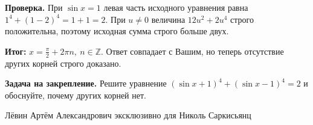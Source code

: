 \documentclass[12pt,a4paper]{article}
\newcommand{\result}{\textcolor{teal!60!black}{Итог:}}
\begin{document}
\textbf{Проверка.} При $\sin x=1$ левая часть исходного уравнения равна $1^4+(1-2)^4=1+1=2$. При $u\ne0$ величина $12u^2+2u^4$ строго положительна, поэтому исходная сумма строго больше двух.

\textbf{\result} $\boxed{x=\frac\pi2+2\pi n,\ n\in\mathbb Z.}$ Ответ совпадает с Вашим, но теперь отсутствие других корней строго доказано.

\textbf{Задача на закрепление.} Решите уравнение $(\sin x+1)^4+(\sin x-1)^4=2$ и обоснуйте, почему других корней нет.

\vfill
\begin{center}\footnotesize Лёвин Артём Александрович эксклюзивно для Николь Саркисьянц\end{center}
\end{document}
